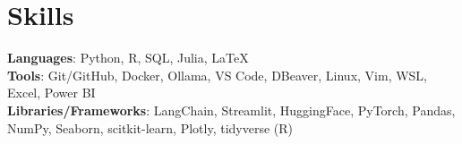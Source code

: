 \documentclass[letterpaper,11pt]{article}
\makeatletter
\newcommand{\resumeItem}[1]{
  \item\small{
    {#1 \vspace{-2pt}}
  }
}
\newcommand{\resumeSubheading}[4]{
  \vspace{-2pt}\item
    \begin{tabular*}{1.0\textwidth}[t]{l@{\extracolsep{\fill}}r}
      \textbf{#1} & \small #2 \\
      \textit{\small#3} & \textit{\small #4} \\
    \end{tabular*}\vspace{-7pt}
}
\newcommand{\resumeSubHeadingListStart}{\begin{itemize}[leftmargin=0.0in, label={}]}
\newcommand{\resumeSubHeadingListEnd}{\end{itemize}}
\newcommand{\resumeItemListStart}{\begin{itemize}}
\newcommand{\resumeItemListEnd}{\end{itemize}\vspace{-5pt}}
\makeatother
\begin{document}


\section{Skills}
  \begin{itemize}[leftmargin=0.15in, label={}]
      \small{\item{
      \textbf{Languages}{: Python, R, SQL, Julia, \LaTeX} \\
      \textbf{Tools}{: Git/GitHub, Docker, Ollama, VS Code, DBeaver, Linux, Vim, WSL, Excel, Power BI} \\
      \textbf{Libraries/Frameworks}{: LangChain, Streamlit, HuggingFace, PyTorch, Pandas, NumPy, Seaborn, scitkit-learn, Plotly, tidyverse (R)}  \\
      }}
  \end{itemize} 

\end{document}
